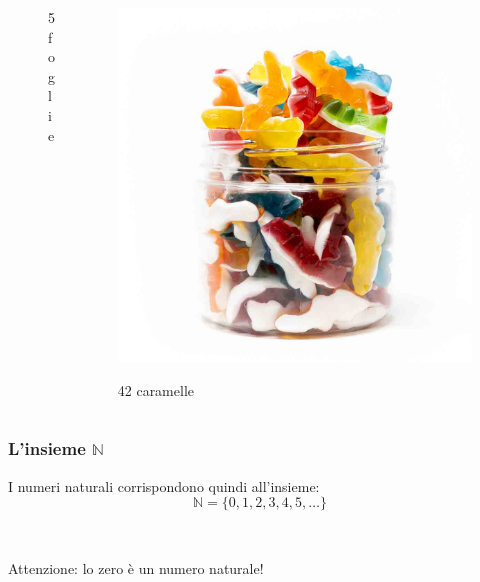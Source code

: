 \documentclass[handout]{beamer}
\theoremstyle{plain}
\begin{document}
\begin{frame}
{\begin{columns}
\begin{column}{0.4\textwidth}
\begin{figure}
    5 foglie
  \end{figure}    
  \end{column}
  \begin{column}{0.4\textwidth}
    \begin{figure}
      \includegraphics[width=.8\columnwidth]{img/caramelle.jpg}

      42 caramelle
    \end{figure} 
  \end{column}
\end{columns}}
\end{frame}


\begin{frame}
\frametitle{L'insieme $ \mathbb{N} $}
I numeri naturali corrispondono quindi all'insieme:
\[ \mathbb{N} = \{ 0, 1, 2, 3, 4, 5, \ldots \}\]\pause

\begin{figure}
\end{figure}\pause

~

Attenzione: lo zero è un numero naturale!
\end{frame}
\end{document}
